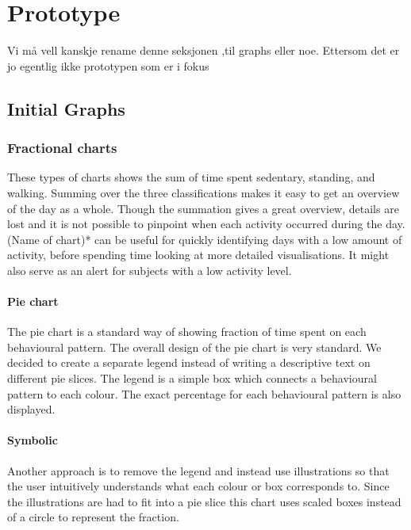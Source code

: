 \chapter{Prototype} %
Vi må vell kanskje rename denne seksjonen ,til graphs eller noe. Ettersom det er jo egentlig ikke prototypen som er i fokus
\label{chapter5} %

\section{Initial Graphs}
\label{sec:initialGraphs}

\subsection{Fractional charts}
These types of charts shows the sum of time spent sedentary, standing, and walking. Summing over the three classifications makes it easy to get an overview of the day as a whole. Though the summation gives a great overview, details are lost and it is not possible to pinpoint when each activity occurred during the day. (Name of chart)* can be useful for quickly identifying days with a low amount of activity, before spending time looking at more detailed visualisations. It might also serve as an alert for subjects with a low activity level.

\subsubsection{Pie chart}
The pie chart is a standard way of showing fraction of time spent on each behavioural pattern. The overall design of the pie chart is very standard. We decided to create a separate legend instead of writing a descriptive text on different pie slices. The legend is a simple box which connects a behavioural pattern to each colour. The exact percentage for each behavioural pattern is also displayed.

\subsubsection{Symbolic}
Another approach is to remove the legend and instead use illustrations so that the user intuitively understands what each colour or box corresponds to. Since the illustrations are had to fit into a pie slice this chart uses scaled boxes instead of a circle to represent the fraction. 

